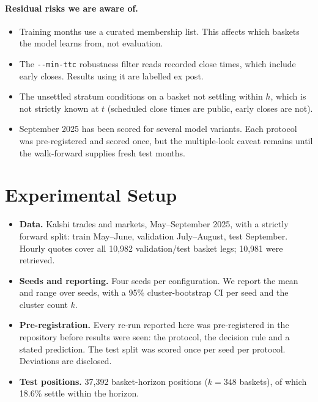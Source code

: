 \documentclass[11pt,a4paper]{article}
\begin{document}
\paragraph{Residual risks we are aware of.}
\begin{itemize}
  \item Training months use a curated membership list. This affects which
    baskets the model learns from, not evaluation.
  \item The \texttt{-{}-min-ttc} robustness filter reads recorded close times,
    which include early closes. Results using it are labelled ex post.
  \item The unsettled stratum conditions on a basket not settling within $h$,
    which is not strictly known at $t$ (scheduled close times are public, early
    closes are not).
  \item September 2025 has been scored for several model variants. Each
    protocol was pre-registered and scored once, but the multiple-look caveat
    remains until the walk-forward supplies fresh test months.
\end{itemize}

\section{Experimental Setup}

\begin{itemize}
  \item \textbf{Data.} Kalshi trades and markets, May--September 2025, with a
    strictly forward split: train May--June, validation July--August, test
    September. Hourly quotes cover all 10{,}982 validation/test basket legs;
    10{,}981 were retrieved.
  \item \textbf{Seeds and reporting.} Four seeds per configuration. We report
    the mean and range over seeds, with a 95\% cluster-bootstrap CI per seed
    and the cluster count $k$.
  \item \textbf{Pre-registration.} Every re-run reported here was pre-registered
    in the repository before results were seen: the protocol, the decision rule
    and a stated prediction. The test split was scored once per seed per
    protocol. Deviations are disclosed.
  \item \textbf{Test positions.} 37{,}392 basket-horizon positions ($k=348$
    baskets), of which 18.6\% settle within the horizon.
\end{itemize}
\end{document}
